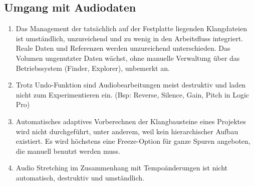 \documentclass[12pt]{article}
\begin{document}
\subsection{Umgang mit Audiodaten}

\begin{enumerate}
\item Das Management der tats\"{a}chlich auf der Festplatte liegenden Klangdateien ist umst\"{a}ndlich, unzureichend und zu wenig in den Arbeitsfluss integriert. Reale Daten und Referenzen werden unzureichend unterschieden. Das Volumen ungenutzter Daten w\"{a}chst, ohne manuelle Verwaltung \"{u}ber das Betriebssystem (Finder, Explorer), unbemerkt an.
\item Trotz Undo-Funktion sind Audiobearbeitungen meist destruktiv und laden nicht zum Experimentieren ein. (Bsp: Reverse, Silence, Gain, Pitch in Logic Pro)
\item Automatisches adaptives Vorberechnen der Klangbausteine eines Projektes wird nicht durchgef\"{u}hrt, unter anderem, weil kein hierarchischer Aufbau existiert. Es wird h\"{o}chstens eine Freeze-Option f\"{u}r ganze Spuren angeboten, die manuell benutzt werden muss.
\item Audio Stretching im Zusammenhang mit Tempo\"{a}nderungen ist nicht automatisch, destruktiv und umst\"{a}ndlich.
\end{enumerate}
\end{document}
